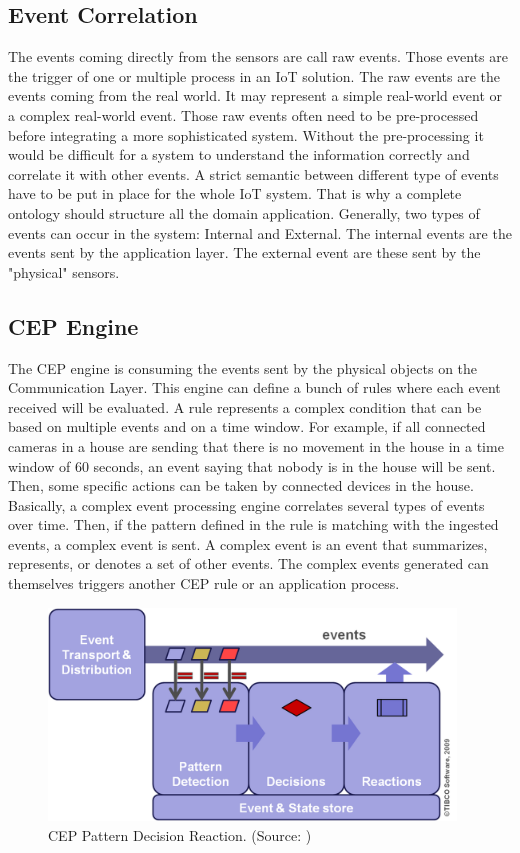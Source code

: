 \documentclass[11pt]{article}
\begin{document}
\subsection{Event Correlation}

The events coming directly from the sensors are call raw events. Those events are the trigger of one or multiple process in an IoT solution. The raw events are the events coming from the real world. It may represent a simple real-world event or a complex real-world event. Those raw events often need to be pre-processed before integrating a more sophisticated system. Without the pre-processing it would be difficult for a system to understand the information correctly and correlate it with other events. A strict semantic between different type of events have to be put in place for the whole IoT system. That is why a complete ontology should structure all the domain application. Generally, two types of events can occur in the system: Internal and External. The internal events are the events sent by the application layer. The external event are these sent by the "physical" sensors.

\subsection{CEP Engine} \label{cep-engine}

The CEP engine is consuming the events sent by the physical objects on the Communication Layer. This engine can define a bunch of rules where each event received will be evaluated. A rule represents a complex condition that can be based on multiple events and on a time window. For example, if all connected cameras in a house are sending that there is no movement in the house in a time window of 60 seconds, an event saying that nobody is in the house will be sent. Then, some specific actions can be taken by connected devices in the house. Basically, a complex event processing engine correlates several types of events over time. Then, if the pattern defined in the rule is matching with the ingested events, a complex event is sent. A complex event is an event that summarizes, represents, or denotes a set of other events\cite{glossary}. The complex events generated can themselves triggers another CEP rule or an application process.
\newline
\begin{figure}[h]
	\includegraphics[width=\textwidth,height=160pt]{assets/cep-pattern-decision-reaction.png} 
	\caption[CEP Pattern Decision Reaction]{CEP Pattern Decision Reaction. (Source: \cite{cep-pattern-decision})}
	\label{fig:cep-pattern-decision-reaction}
\end{figure}
\end{document}
